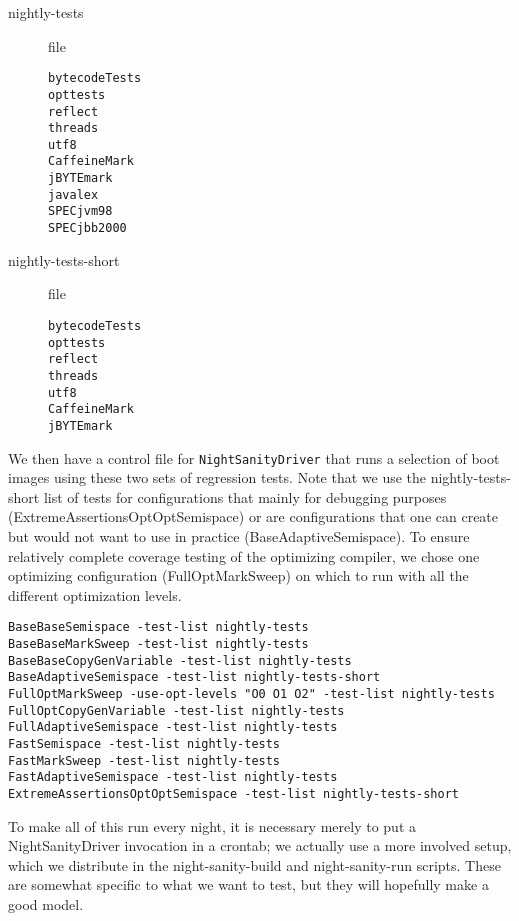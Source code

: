 \begin{description}
\item[nightly-tests] file
\begin{verbatim}
bytecodeTests
opttests
reflect
threads
utf8
CaffeineMark
jBYTEmark
javalex 
SPECjvm98 
SPECjbb2000 
\end{verbatim}
\item[nightly-tests-short] file
\begin{verbatim}
bytecodeTests
opttests
reflect
threads
utf8
CaffeineMark
jBYTEmark
\end{verbatim}
\end{description}

 We then have a control file for {\tt{NightSanityDriver}} that runs a
selection of boot images using these two sets of regression tests.
Note that we use the nightly-tests-short list of tests for
configurations that mainly for debugging purposes
(ExtremeAssertionsOptOptSemispace) or are configurations that one can
create but would not want to use in practice (BaseAdaptiveSemispace).
To ensure relatively complete coverage testing of the optimizing
compiler, we chose one optimizing configuration (FullOptMarkSweep) on
which to run with all the different optimization levels.

\begin{verbatim}
BaseBaseSemispace -test-list nightly-tests
BaseBaseMarkSweep -test-list nightly-tests
BaseBaseCopyGenVariable -test-list nightly-tests 
BaseAdaptiveSemispace -test-list nightly-tests-short
FullOptMarkSweep -use-opt-levels "O0 O1 O2" -test-list nightly-tests
FullOptCopyGenVariable -test-list nightly-tests
FullAdaptiveSemispace -test-list nightly-tests
FastSemispace -test-list nightly-tests
FastMarkSweep -test-list nightly-tests
FastAdaptiveSemispace -test-list nightly-tests
ExtremeAssertionsOptOptSemispace -test-list nightly-tests-short
\end{verbatim}

 To make all of this run every night, it is necessary merely to put a
NightSanityDriver invocation in a crontab; we actually use a more
involved setup, which we distribute in the night-sanity-build and
night-sanity-run scripts.  These are somewhat specific to what we want
to test, but they will hopefully make a good model.

\JikesTMFooter

\JavaTMFooter

